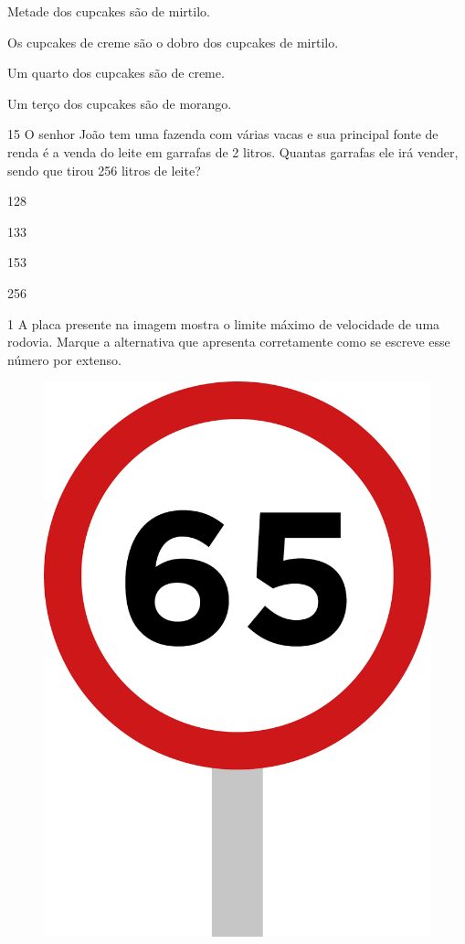 
\begin{escolha}[itemsep=-5pt]
\item Metade dos cupcakes são de mirtilo.

\item Os cupcakes de creme são o dobro dos cupcakes de mirtilo.

\item Um quarto dos cupcakes são de creme.

\item Um terço dos cupcakes são de morango.
\end{escolha}


\num{15} O senhor João tem uma fazenda com várias vacas e sua principal fonte de renda é a venda do leite em garrafas de 2 litros. Quantas
garrafas ele irá vender, sendo que tirou 256 litros de leite?

\begin{escolha}[itemsep=-5pt]
\item 128

\item 133

\item 153

\item 256
\end{escolha}

\blankpage
\vspace*{-3.4cm}


\num{1} A placa presente na imagem mostra o limite máximo de velocidade de uma
rodovia. Marque a alternativa que apresenta corretamente como se escreve
esse número por extenso.

\begin{figure}[H]
\centering
\includegraphics[width=.25\textwidth]{./media/image151.png}
\end{figure}

